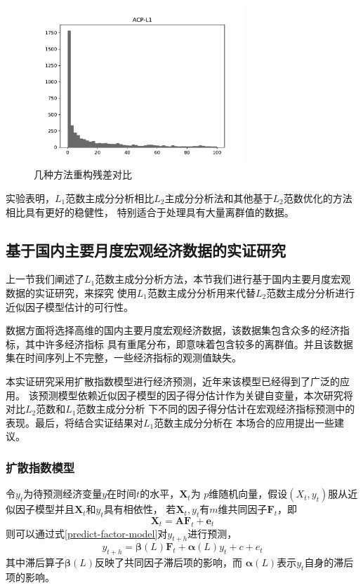 \begin{figure}[H]
\begin{minipage}[t]{0.48\textwidth}
    \end{minipage}
    \begin{minipage}[t]{0.48\textwidth}
    \includegraphics[width=8cm]{pics/lab1/acp-l1.pdf}
    \end{minipage}
    \caption{\small 几种方法重构残差对比}
\end{figure}

实验表明，$L_1$范数主成分分析相比$L_2$主成分分析法和其他基于$L_2$范数优化的方法相比具有更好的稳健性，
特别适合于处理具有大量离群值的数据。

\subsection{基于国内主要月度宏观经济数据的实证研究}
上一节我们阐述了$L_1$范数主成分分析方法，本节我们进行基于国内主要月度宏观数据的实证研究，来探究
使用$L_1$范数主成分分析用来代替$L_2$范数主成分分析进行近似因子模型估计的可行性。

数据方面将选择高维的国内主要月度宏观经济数据，该数据集包含众多的经济指标，其中许多经济指标
具有重尾分布，即意味着包含较多的离群值。并且该数据集在时间序列上不完整，一些经济指标的观测值缺失。

本实证研究采用扩散指数模型进行经济预测\cite{stock2002macroeconomic}，近年来该模型已经得到了广泛的应用。
该预测模型依赖近似因子模型的因子得分估计作为关键自变量，本次研究将对比$L_2$范数和$L_1$范数主成分分析
下不同的因子得分估计在宏观经济指标预测中的表现。最后，将结合实证结果对$L_1$范数主成分分析在
本场合的应用提出一些建议。

\subsubsection{扩散指数模型}
令$y_t$为待预测经济变量$y$在时间$t$的水平，$\bm{X}_t$为
$p$维随机向量，假设$(X_t,y_t)$服从近似因子模型并且$\bm{X}_t$和$y_t$具有相依性，
若$\bm{X}_t, y_t$有$m$维共同因子$\bm{F}_t$，即
\begin{equation}
    \bm{X}_t = \bm{A}\bm{F}_t + \bm{e}_t
\end{equation}
则可以通过式\eqref{predict-factor-model}对$y_{t+h}$进行预测，
\begin{equation}\label{predict-factor-model}
    y_{t+h} = \bm{\beta}(L)\bm{F}_t + \bm{\alpha}(L)y_t + c + e_t
\end{equation}
其中滞后算子$\bm{\beta}(L)$反映了共同因子滞后项的影响，而
$\bm{\alpha}(L)$表示$y_t$自身的滞后项的影响。

